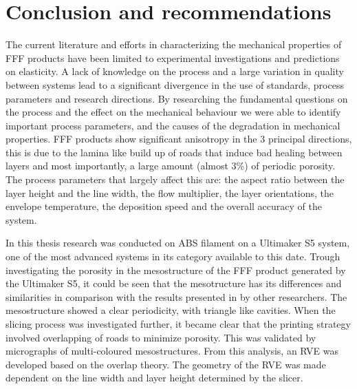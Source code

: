 \chapter{Conclusion and recommendations}
\label{chp:8}



The current literature and efforts in characterizing the mechanical properties of FFF products have been limited to experimental investigations and predictions on elasticity. A lack of knowledge on the process and a large variation in quality between systems lead to a significant divergence in the use of standards, process parameters and research directions. By researching the fundamental questions on the process and the effect on the mechanical behaviour we were able to identify important process parameters, and the causes of the degradation in mechanical properties. FFF products show significant anisotropy in the 3 principal directions, this is due to the lamina like build up of roads that induce bad healing between layers and most importantly, a large amount (almost 3\%) of periodic porosity. The process parameters that largely affect this are: the aspect ratio between the layer height and the line width, the flow multiplier, the layer orientations, the envelope temperature, the deposition speed and the overall accuracy of the system.

In this thesis research was conducted on ABS filament on a Ultimaker S5 system, one of the most advanced systems in its category available to this date. Trough investigating the porosity in the mesostructure of the FFF product generated by the Ultimaker S5, it could be seen that the mesotructure has its differences and similarities in comparison with the results presented in by other researchers. The mesostructure showed a clear periodicity, with triangle like cavities. When the slicing process was investigated further, it became clear that the printing strategy involved overlapping of roads to minimize porosity. This was validated by micrographs of multi-coloured mesostructures. From this analysis, an RVE was developed based on the overlap theory. The geometry of the RVE was made dependent on the line width and layer height determined by the slicer. 

